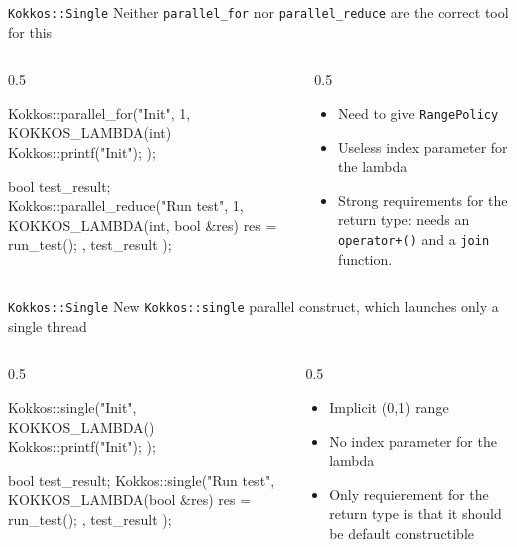 \begin{frame}[fragile]{\texttt{Kokkos::Single}}
  Neither \texttt{parallel\_for} nor \texttt{parallel\_reduce} are the correct tool for this

  \begin{columns}
    \begin{column}{0.5\linewidth}
      \begin{code}[keywords={KOKKOS_LAMBDA,parallel_for,single}]
  Kokkos::parallel_for("Init", 1,
      KOKKOS_LAMBDA(int) {
          Kokkos::printf("Init\n");
      }
  );

  bool test_result;
  Kokkos::parallel_reduce("Run test", 1,
      KOKKOS_LAMBDA(int, bool &res) {
          res = run_test();
      },
      test_result
  );
      \end{code}
    \end{column}
    \begin{column}{0.5\linewidth}
      \begin{itemize}
        \item Need to give \texttt{RangePolicy}
        \item Useless index parameter for the lambda
        \item Strong requirements for the return type: needs an \texttt{operator+()} and a \texttt{join} function.
      \end{itemize}
    \end{column}
  \end{columns}
\end{frame}

\begin{frame}[fragile]{\texttt{Kokkos::Single}}
  New \texttt{Kokkos::single} parallel construct, which launches only a single thread

  \begin{columns}
    \begin{column}{0.5\linewidth}
      \begin{code}[keywords={KOKKOS_LAMBDA,parallel_for,single}]
  Kokkos::single("Init",
      KOKKOS_LAMBDA() {
          Kokkos::printf("Init\n");
      }
  );

  bool test_result;
  Kokkos::single("Run test",
      KOKKOS_LAMBDA(bool &res) {
          res = run_test();
      },
      test_result
  );
      \end{code}
    \end{column}
    \begin{column}{0.5\linewidth}
      \begin{itemize}
        \item Implicit (0,1) range
        \item No index parameter for the lambda
        \item Only requierement for the return type is that it should be default constructible
      \end{itemize}
    \end{column}
  \end{columns}
\end{frame}

